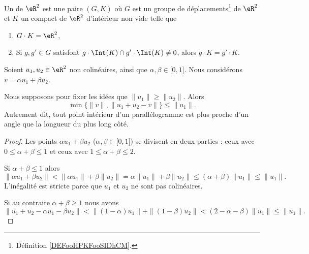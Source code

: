 \begin{definition}
    Un  de \( \eR^2\) est une paire \( (G,K)\) où \( G\) est un groupe de déplacements\footnote{Définition \ref{DEFooHPKFooSIDhCM}.} de \( \eR^2\) et \( K\) un compact de \( \eR^2\) d'intérieur non vide telle que
    \begin{enumerate}
        \item
            \( G\cdot K=\eR^2\),
        \item
            Si \( g,g'\in G\) satisfont \( g\cdot \Int(K)\cap g'\cdot\Int(K)\neq 0\), alors \( g\cdot K=g'\cdot K\).
    \end{enumerate}
\end{definition}

\begin{lemma}        \label{LEMooEKWZooYbcGBp}
    Soient \( u_1,u_2\in \eR^2\) non colinéaires, ainsi que \( \alpha,\beta\in \mathopen[ 0 , 1 \mathclose]\). Nous considérons \( v=\alpha u_1+\beta u_2\).

    Nous supposons pour fixer les idées que \( \| u_1 \|\geq \| u_2 \|\). Alors
    \begin{equation}
        \min\{ \| v \|, \| u_1+u_2-v \| \}\leq \| u_1 \|.
    \end{equation}
    Autrement dit, tout point intérieur d'un parallélogramme est plus proche d'un angle que la longueur du plus long côté.
\end{lemma}

\begin{proof}
    Les points \( \alpha u_1+\beta u_2\) (\( \alpha,\beta\in \mathopen[ 0 , 1 \mathclose]\)) se divisent en deux parties : ceux avec \( 0\leq\alpha+\beta\leq 1\) et ceux avec \( 1\leq\alpha+\beta\leq 2\).

    Si \( \alpha+\beta\leq 1\) alors
    \begin{equation}
        \| \alpha u_1+\beta u_2 \|<\| \alpha u_1 \|+\beta\| u_2 \|= \alpha\| u_1 \|+\beta\| u_2 \|\leq (\alpha+\beta)\| u_1 \|\leq \| u_1 \|.
    \end{equation}
    L'inégalité est stricte parce que \( u_1\) et \( u_2\) ne sont pas colinéaires.

    Si au contraire \( \alpha+\beta\geq 1\) nous avons
    \begin{equation}
        \| u_1+u_2-\alpha u_1-\beta u_2 \|<\| (1-\alpha)u_1 \|+\| (1-\beta)u_2 \|<(2-\alpha-\beta)\| u_1 \|\leq \| u_1 \|.
    \end{equation}
\end{proof}

